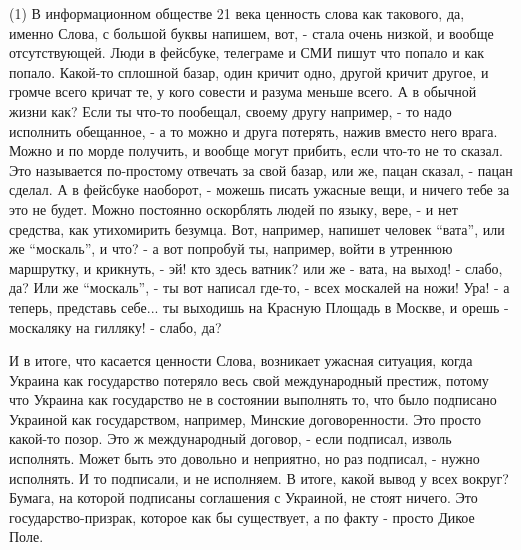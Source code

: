 (1) В информационном обществе 21 века ценность слова как такового, да, именно
Слова, с большой буквы напишем, вот, - стала очень низкой, и вообще
отсутствующей. Люди в фейсбуке, телеграме и СМИ пишут что попало и как попало.
Какой-то сплошной базар, один кричит одно, другой кричит другое, и громче всего
кричат те, у кого совести и разума меньше всего.  А в обычной жизни как? Если
ты что-то пообещал, своему другу например, - то надо исполнить обещанное, - а
то можно и друга потерять, нажив вместо него врага. Можно и по морде получить,
и вообще могут прибить, если что-то не то сказал. Это называется по-простому
отвечать за свой базар, или же, пацан сказал, - пацан сделал. А в фейсбуке
наоборот, - можешь писать ужасные вещи, и ничего тебе за это не будет. Можно
постоянно оскорблять людей по языку, вере, - и нет средства, как утихомирить
безумца. Вот, например, напишет человек \enquote{вата}, или же
\enquote{москаль}, и что? - а вот попробуй ты, например, войти в утреннюю
маршрутку, и крикнуть, - эй! кто здесь ватник?  или же - вата, на выход! -
слабо, да? Или же \enquote{москаль}, - ты вот написал где-то, - всех москалей
на ножи! Ура! - а теперь, представь себе... ты выходишь на Красную Площадь в
Москве, и орешь - москаляку на гилляку! - слабо, да?

И в итоге, что касается ценности Слова, возникает ужасная ситуация, когда
Украина как государство потеряло весь свой международный престиж, потому что
Украина как государство не в состоянии выполнять то, что было подписано
Украиной как государством, например, Минские договоренности. Это просто
какой-то позор. Это ж международный договор, - если подписал, изволь исполнять.
Может быть это довольно и неприятно, но раз подписал, - нужно исполнять. И то
подписали, и не исполняем. В итоге, какой вывод у всех вокруг? Бумага, на
которой подписаны соглашения с Украиной, не стоят ничего. Это
государство-призрак, которое как бы существует, а по факту - просто Дикое Поле.

